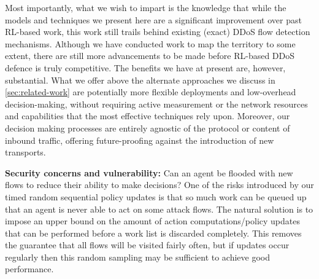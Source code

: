 \documentclass[conference, a4paper, 10pt, times]{IEEEtran}
\newcommand{\fakepara}[1]{\noindent\textbf{#1:}}
\begin{document}

Most importantly, what we wish to impart is the knowledge that while the models and techniques we present here are a significant improvement over past RL-based work, this work still trails behind existing (exact) DDoS flow detection mechanisms.
Although we have conducted work to map the territory to some extent, there are still more advancements to be made before RL-based DDoS defence is truly competitive.
The benefits we have at present are, however, substantial.
What we offer above the alternate approaches we discuss in \cref{sec:related-work} are potentially more flexible deployments and low-overhead decision-making, without requiring active measurement or the network resources and capabilities that the most effective techniques rely upon.
Moreover, our decision making processes are entirely agnostic of the protocol or content of inbound traffic, offering future-proofing against the introduction of new transports.

\fakepara{Security concerns and vulnerability}
Can an agent be flooded with new flows to reduce their ability to make decisions?
One of the risks introduced by our timed random sequential policy updates is that so much work can be queued up that an agent is never able to act on some attack flows.
The natural solution is to impose an upper bound on the amount of action computations/policy updates that can be performed before a work list is discarded completely.
This removes the guarantee that all flows will be visited fairly often, but if updates occur regularly then this random sampling may be sufficient to achieve good performance.
\end{document}
